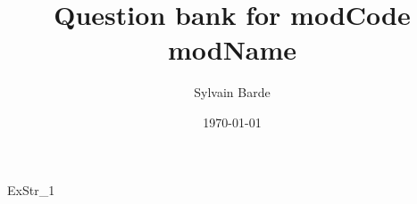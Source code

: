\documentclass[a4paper, leqno, 12pt]{report}
\title{\bf Question bank for modCode modName}
\author{Sylvain Barde}
\date{\today}
\begin{document}
\maketitle                              %
\hypertarget{contents}{}                %
\tableofcontents                        %

\singlespacing

ExStr_1

\end{document}

